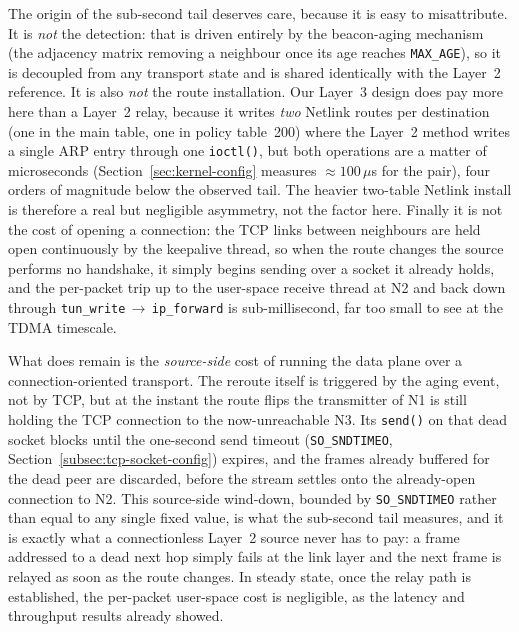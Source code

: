 The origin of the sub-second tail deserves care, because it is easy to
misattribute. It is \emph{not} the detection: that is driven entirely by the
beacon-aging mechanism (the adjacency matrix removing a neighbour once its age
reaches \texttt{MAX\_AGE}), so it is decoupled from any transport state and is
shared identically with the Layer~2 reference. It is also \emph{not} the route
installation. Our Layer~3 design does pay more here than a Layer~2 relay,
because it writes \emph{two} Netlink routes per destination (one in the main
table, one in policy table~200) where the Layer~2 method writes a single ARP
entry through one \texttt{ioctl()}, but both operations are a matter of
microseconds (Section~\ref{sec:kernel-config} measures $\approx 100\,\mu$s for
the pair), four orders of magnitude below the observed tail. The heavier
two-table Netlink install is therefore a real but negligible asymmetry, not the
factor here. Finally it is not the cost of opening a connection: the TCP links
between neighbours are held open continuously by the keepalive thread, so when
the route changes the source performs no handshake, it simply begins sending
over a socket it already holds, and the per-packet trip up to the user-space
receive thread at N2 and back down through
\texttt{tun\_write}\,$\to$\,\texttt{ip\_forward} is sub-millisecond, far too
small to see at the TDMA timescale.

What does remain is the \emph{source-side} cost of running the data plane over
a connection-oriented transport. The reroute itself is triggered by the aging
event, not by TCP, but at the instant the route flips the transmitter of N1 is
still holding the TCP connection to the now-unreachable N3. Its \texttt{send()}
on that dead socket blocks until the one-second send timeout
(\texttt{SO\_SNDTIMEO}, Section~\ref{subsec:tcp-socket-config}) expires, and the
frames already buffered for the dead peer are discarded, before the stream
settles onto the already-open connection to N2. This source-side wind-down,
bounded by \texttt{SO\_SNDTIMEO} rather than equal to any single fixed value, is
what the sub-second tail measures, and it is exactly what a connectionless
Layer~2 source never has to pay: a frame addressed to a dead next hop simply
fails at the link layer and the next frame is relayed as soon as the route
changes. In steady state, once the relay path is established, the per-packet
user-space cost is negligible, as the latency and throughput results already
showed.

